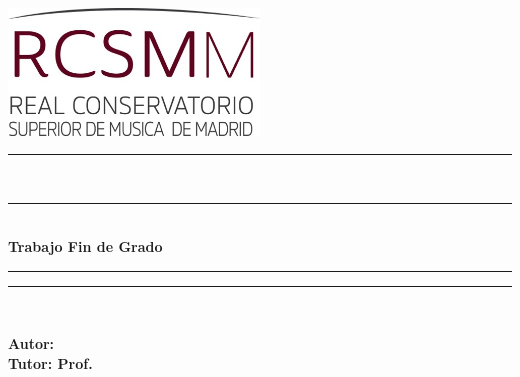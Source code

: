 \begin{titlepage}
	\setlength{\topmargin}{-2cm} 
	\begin{center}
		
		\vspace*{5mm}
		\includegraphics[width=0.5\textwidth]{Images/logo-rcsmm-vertical_500.jpg} %
		\vspace{4mm}
		
		
		\rule[0.5ex]{\linewidth}{1pt}\vspace*{-\baselineskip}\vspace*{3.2pt}\\
		\rule[0.5ex]{\linewidth}{1pt}\\
		[0.8cm]
		
		{\huge \textbf{{Trabajo Fin de Grado}}} \\[1cm]
		\rule[0.5ex]{\linewidth}{1pt}\vspace*{-\baselineskip}\vspace{3.2pt}
		\rule[0.5ex]{\linewidth}{1pt}\\
		\vspace{1.2cm}
		
		{\LARGE {\textbf{\titulo}}}
		\vspace{1.2cm}
		
		{\Large {{\subtitulo }}}
		\vspace{1.2cm}
		
		{\Large\textit{\grado}}
		
		\vspace{1.5cm}
		{\large \textit{{\fecha}}}        
	\end{center}
	\vspace{1.2cm}
	{\large \textbf{Autor: \autor}} \\
	{\large \textbf{Tutor: Prof. \tutor}}
\end{titlepage}
	

